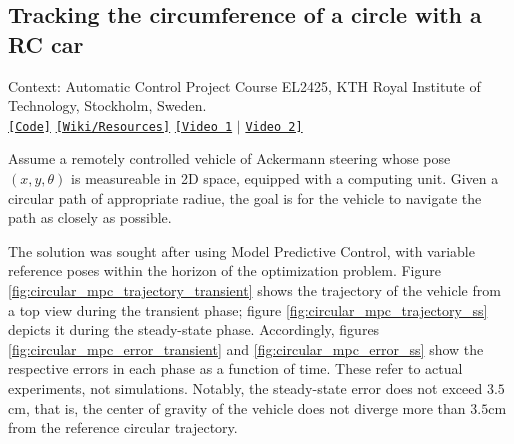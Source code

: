 \subsection{Tracking the circumference of a circle with a RC car}

Context: Automatic Control Project Course EL2425, KTH Royal Institute of
Technology, Stockholm, Sweden.\\

\noindent \href{https://github.com/li9i/HT16_P2_EL2425}{\texttt{[Code]}} \href{https://github.com/li9i/HT16_P2_EL2425_resources}{\texttt{[Wiki/Resources]}} \href{https://www.youtube.com/watch?v=Vh1huYlyD_8}{\texttt{[Video 1}} $|$ \href{https://youtu.be/937OZez1iN8?t=69}{\texttt{Video 2]}}


\begin{problem}
Assume a remotely controlled vehicle of Ackermann steering whose pose
$(x,y,\theta)$ is measureable in 2D space, equipped with a computing unit.
Given a circular path of appropriate radiue, the goal is for the vehicle to
navigate the path as closely as possible.
\end{problem}

The solution was sought after using Model Predictive Control, with variable
reference poses within the horizon of the optimization problem. Figure
\ref{fig:circular_mpc_trajectory_transient} shows the trajectory of the vehicle
from a top view during the transient phase; figure
\ref{fig:circular_mpc_trajectory_ss} depicts it during the steady-state phase.
Accordingly, figures \ref{fig:circular_mpc_error_transient} and
\ref{fig:circular_mpc_error_ss} show the respective errors in each phase as a
function of time. These refer to actual experiments, not simulations.  Notably,
the steady-state error does not exceed $3.5$cm, that is, the center of gravity
of the vehicle does not diverge more than $3.5$cm from the reference circular
trajectory.

\noindent{}

